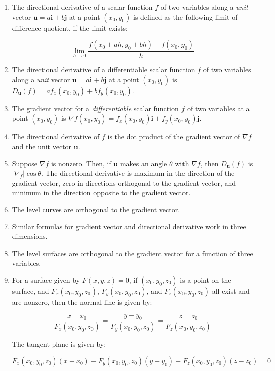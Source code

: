 \documentclass[10pt]{amsart}
\begin{document}
\begin{enumerate}
\item The directional derivative of a scalar function
  $f$ of two variables along a {\em unit} vector $\mathbf{u} =
  a\mathbf{i} + b\mathbf{j}$ at a point $(x_0,y_0)$ is defined as the
  following limit of difference quotient, if the limit exists:

  $$\lim_{h \to 0} \frac{f(x_0 + ah, y_0 + bh) - f(x_0,y_0)}{h}$$

\item The directional derivative of a differentiable scalar function
  $f$ of two variables along a {\em unit} vector $\mathbf{u} =
  a\mathbf{i} + b\mathbf{j}$ at a point $(x_0,y_0)$ is
  $D_{\mathbf{u}}(f) = af_x(x_0,y_0) + bf_y(x_0,y_0)$.
\item The gradient vector for a {\em differentiable} scalar function
  $f$ of two variables at a point $(x_0,y_0)$ is $\nabla f(x_0,y_0) =
  f_x(x_0,y_0)\mathbf{i} + f_y(x_0,y_0)\mathbf{j}$.
\item The directional derivative of $f$ is the dot product of the
  gradient vector of $\nabla f$ and the unit vector $\mathbf{u}$. 
\item Suppose $\nabla f$ is nonzero. Then, if $\mathbf{u}$ makes an
  angle $\theta$ with $\nabla f$, then $D_{\mathbf{u}}(f)$ is
  $|\nabla_f|\cos \theta$. The directional derivative is maximum in
  the direction of the gradient vector, zero in directions orthogonal
  to the gradient vector, and minimum in the direction opposite to the
  gradient vector.
\item The level curves are orthogonal to the gradient vector.
\item Similar formulas for gradient vector and directional derivative
  work in three dimensions.
\item The level surfaces are orthogonal to the gradient vector for a
  function of three variables.
\item For a surface given by $F(x,y,z) = 0$, if $(x_0,y_0,z_0)$ is a
  point on the surface, and $F_x(x_0,y_0,z_0)$, $F_y(x_0,y_0,z_0)$,
  and $F_z(x_0,y_0,z_0)$ all exist and are nonzero, then the normal
  line is given by:

  $$\frac{x - x_0}{F_x(x_0,y_0,z_0)} = \frac{y - y_0}{F_y(x_0,y_0,z_0)} = \frac{z - z_0}{F_z(x_0,y_0,z_0)}$$

  The tangent plane is given by:

  $$F_x(x_0,y_0,z_0)(x - x_0) + F_y(x_0,y_0,z_0)(y - y_0) + F_z(x_0,y_0,z_0)(z - z_0) = 0$$
\end{enumerate}
\end{document}
